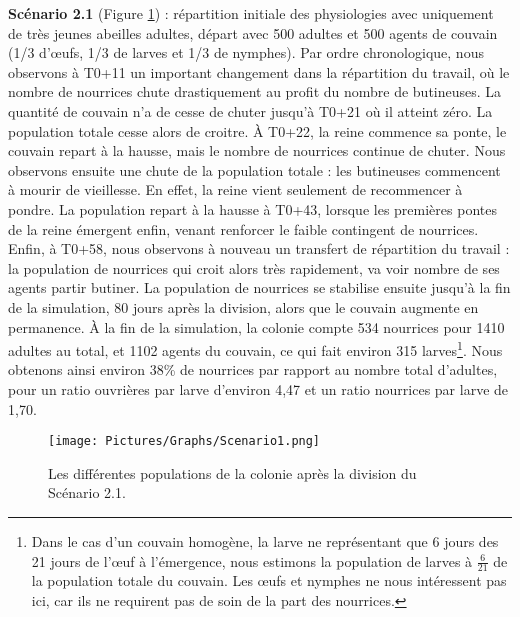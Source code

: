 		\textbf{Scénario 2.1} (Figure \ref{sc1}) : répartition initiale des physiologies avec uniquement de très jeunes abeilles adultes, départ avec 500 adultes et 500 agents de couvain (1/3 d'œufs, 1/3 de larves et 1/3 de nymphes). Par ordre chronologique, nous observons à T0+11 un important changement dans la répartition du travail, où le nombre de nourrices chute drastiquement au profit du nombre de butineuses. La quantité de couvain n'a de cesse de chuter jusqu'à T0+21 où il atteint zéro. La population totale cesse alors de croitre. À T0+22, la reine commence sa ponte, le couvain repart à la hausse, mais le nombre de nourrices continue de chuter. Nous observons ensuite une chute de la population totale : les butineuses commencent à mourir de vieillesse. En effet, la reine vient seulement de recommencer à pondre. La population repart à la hausse à T0+43, lorsque les premières pontes de la reine émergent enfin, venant renforcer le faible contingent de nourrices. Enfin, à T0+58, nous observons à nouveau un transfert de répartition du travail : la population de nourrices qui croit alors très rapidement, va voir nombre de ses agents partir butiner. La population de nourrices se stabilise ensuite jusqu'à la fin de la simulation, 80 jours après la division, alors que le couvain augmente en permanence. À la fin de la simulation, la colonie compte 534 nourrices pour 1410 adultes au total, et 1102 agents du couvain, ce qui fait environ 315 larves\footnote{\label{footCalculLarves} Dans le cas d'un couvain homogène, la larve ne représentant que 6 jours des 21 jours de l'œuf à l'émergence, nous estimons la population de larves à $\frac{6}{21}$ de la population totale du couvain. Les œufs et nymphes ne nous intéressent pas ici, car ils ne requirent pas de soin de la part des nourrices.}. Nous obtenons ainsi environ 38\% de nourrices par rapport au nombre total d'adultes, pour un ratio ouvrières par larve d'environ 4,47 et un ratio nourrices par larve de 1,70.
	
	\begin{figure}
	\centering
	\texttt{[image: Pictures/Graphs/Scenario1.png]}
	\caption{Les différentes populations de la colonie après la division du Scénario 2.1.}
	\label{sc1}
	\end{figure}
		
